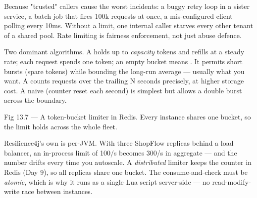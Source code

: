  Because "trusted" callers cause the worst incidents: a buggy retry loop in a sister service, a batch job that fires 100k requests at once, a mis-configured client polling every 10ms. Without a limit, one internal caller starves every other tenant of a shared pool. Rate limiting is fairness enforcement, not just abuse defence.

 Two dominant algorithms. A  holds up to \emph{capacity} tokens and refills at a steady rate; each request spends one token; an empty bucket means . It permits short bursts (spare tokens) while bounding the long-run average --- usually what you want. A  counts requests over the trailing N seconds precisely, at higher storage cost. A naive  (counter reset each second) is simplest but allows a double burst across the boundary.

\begin{wbfigure}{Fig 13.7 --- A token-bucket limiter in Redis. Every instance shares one bucket, so the limit holds across the whole fleet.}
\end{wbfigure}

 Resilience4j's own  is per-JVM. With three ShopFlow replicas behind a load balancer, an in-process limit of 100/s becomes 300/s in aggregate --- and the number drifts every time you autoscale. A \emph{distributed} limiter keeps the counter in Redis (Day 9), so all replicas share one bucket. The consume-and-check must be \emph{atomic}, which is why it runs as a single Lua script server-side --- no read-modify-write race between instances.

